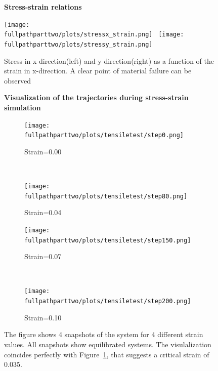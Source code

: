 \documentclass[10pt,a4paper]{report}
\def \fullpathparttwo {/home/lukas/Desktop/project/independence/atomistic_modeling/exam/2_Two-dimensional_atomic_tensile_test}
\newcommand*{\figuretitle}[1]{%
    {\centering%
    \textbf{#1}%
    \par\medskip}%
}
\begin{document}
\begin{center}
\begin{figure}[h]
\figuretitle{Stress-strain relations}
\texttt{[image: \\fullpathparttwo/plots/stressx\_strain.png]}~
\texttt{[image: \\fullpathparttwo/plots/stressy\_strain.png]}
\caption[Stress-strain relations]{Stress in x-direction(left) and y-direction(right) as a function of the strain in x-direction. A clear point of material failure can be observed  }
\label{fig:p2_stress_strain_relation}
\end{figure}
\end{center}


\begin{center}
\begin{figure}[h]
\figuretitle{Visualization of the trajectories during stress-strain simulation}
\begin{subfigure}{0.5\textwidth}
  \texttt{[image: \\fullpathparttwo/plots/tensiletest/step0.png]}
  \caption{Strain=0.00}
\end{subfigure}~
\begin{subfigure}{0.5\textwidth}
  \texttt{[image: \\fullpathparttwo/plots/tensiletest/step80.png]}
  \caption{Strain=0.04}
\end{subfigure}

\begin{subfigure}{0.5\textwidth}
  \texttt{[image: \\fullpathparttwo/plots/tensiletest/step150.png]}
  \caption{Strain=0.07}
\end{subfigure}~
\begin{subfigure}{0.5\textwidth}
  \texttt{[image: \\fullpathparttwo/plots/tensiletest/step200.png]}
  \caption{Strain=0.10}
\end{subfigure}


\caption[Visualization of the trajectories during stress-strain simulation]{The figure shows 4 snapshots of the system for 4 different strain values. All snapshots show equilibrated systems. The visulalization coincides perfectly with Figure~\ref{fig:p2_stress_strain_relation}, that suggests a critical strain of $0.035$.}
\label{fig:p2_stress_strain_relation_snapshots}
\end{figure}
\end{center}
\end{document}
